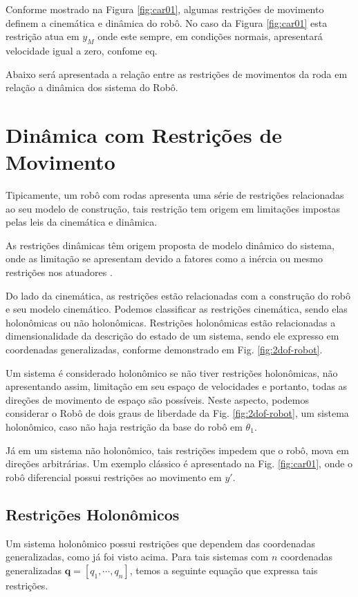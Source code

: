 Conforme mostrado na Figura \ref{fig:car01}, algumas restrições de movimento definem a cinemática e dinâmica do robô. No caso da Figura  \ref{fig:car01} esta restrição atua em $y_M$ onde este sempre, em condições normais, apresentará velocidade igual a zero, confome eq.

Abaixo será apresentada a relação entre as restrições de movimentos da roda em relação a dinâmica dos sistema do Robô.

\section{Dinâmica com Restrições de Movimento}

Tipicamente, um robô com rodas apresenta uma série de restrições relacionadas ao seu modelo de construção, tais restrição tem origem em limitações impostas pelas leis da cinemática e dinâmica.

As restrições dinâmicas têm origem proposta de modelo dinâmico do sistema, onde as limitação se apresentam devido a fatores como a inércia ou mesmo restrições nos atuadores \cite{klancar2017wheeled}.

Do lado da cinemática, as restrições estão relacionadas com a construção do robô e seu modelo cinemático. Podemos classificar as restrições cinemática, sendo elas holonômicas ou não holonômicas. Restrições holonômicas estão relacionadas a dimensionalidade da descrição do estado de um sistema, sendo ele expresso em coordenadas generalizadas, conforme demonstrado em Fig. \ref{fig:2dof-robot}.

Um sistema é considerado holonômico se não tiver restrições holonômicas, não apresentando assim, limitação em seu espaço de velocidades e portanto, todas as direções de movimento de espaço são possíveis. Neste aspecto, podemos considerar o Robô de dois graus de liberdade da Fig. \ref{fig:2dof-robot}, um sistema holonômico, caso não haja restrição da base do robô em $\theta_1$.

Já em um sistema não holonômico, tais restrições impedem que o robô, mova em direções arbitrárias. Um exemplo clássico é apresentado na Fig. \ref{fig:car01}, onde o robô diferencial possui restrições ao movimento em $y'$.


\subsection{Restrições Holonômicos}
 Um sistema holonômico possui restrições que dependem das coordenadas generalizadas, como já foi visto acima. Para tais sistemas com $n$ coordenadas generalizadas $\mathbf{q} = [q_1, \cdots, q_n]$, temos a seguinte equação que expressa tais restrições.

